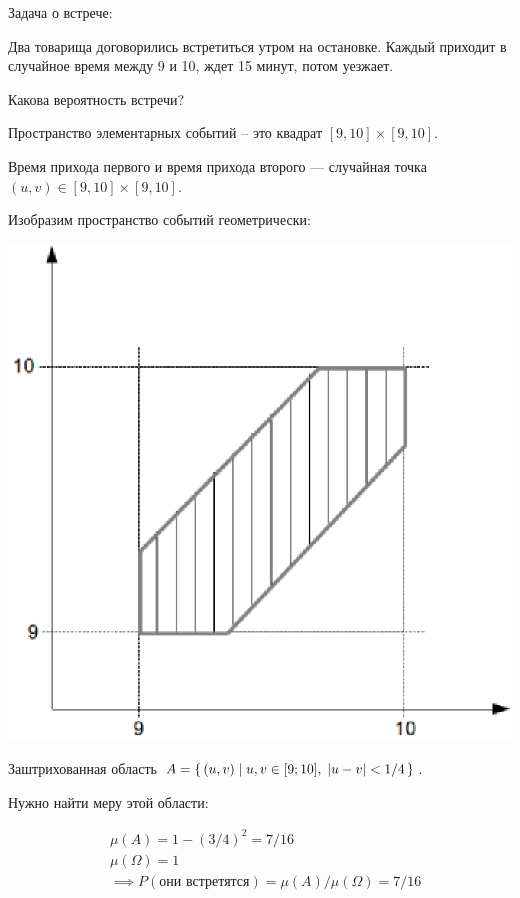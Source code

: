 \begin{example}
	Задача о встрече:
	
	Два товарища договорились встретиться утром на остановке. Каждый приходит в случайное время между 9 и 10, ждет 15 минут, потом уезжает.

	Какова вероятность встречи?\\

	\begin{solution}
		Пространство элементарных событий -- это квадрат $[9, 10] \times [9, 10]$.

		Время прихода первого и время прихода второго --- случайная точка $(u, v) \in [9, 10] \times [9, 	10]$.

		Изобразим пространство событий геометрически:

		\includegraphics{pictures/13_09_graph.eps}

		Заштрихованная область $A = \left\{ \, (u, v) \mid u, v \in [9; 10],\; |u - v| < 1/4  \, \right\}$.

		Нужно найти меру этой области:

		\begin{align*}
			&\mu(A) = 1 - (3/4)^2 = 7/16\\
			&\mu(\Omega) = 1\\
			&\implies P(\text{они встретятся}) = \mu(A) / \mu(\Omega) = 7/16\\
		\end{align*}

	\end{solution}
\end{example}

